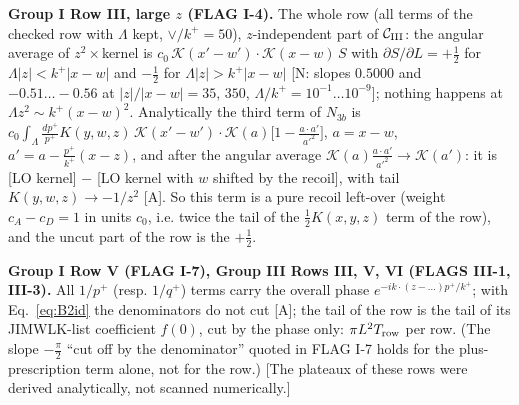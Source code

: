 \documentclass[9pt]{article}
\numberwithin{equation}{section}
\begin{document}
\noindent\textbf{Group I Row III, large $z$ (FLAG I-4).} The whole row (all terms of the checked row with $\Lambda$ kept, $\vee/k^{+}=50$), $z$-independent part of $\mathcal{C}_{\rm III}$: the angular average of $z^{2}\times$kernel is $c_{0}\,\mathcal{K}(x'-w')\cdot\mathcal{K}(x-w)\,S$ with $\partial S/\partial L=+\frac12$ for $\Lambda|z|<k^{+}|x-w|$ and $-\frac12$ for $\Lambda|z|>k^{+}|x-w|$ [N: slopes $0.5000$ and $-0.51\dots-0.56$ at $|z|/|x-w|=35,\,350$, $\Lambda/k^{+}=10^{-1}\dots10^{-9}$]; nothing happens at $\Lambda z^{2}\sim k^{+}(x-w)^{2}$. Analytically the third term of $N_{3b}$ is
$c_{0}\int_{\Lambda}\frac{dp^{+}}{p^{+}}K(y,w,z)\,\mathcal{K}(x'-w')\cdot\mathcal{K}(a)\big[1-\frac{a\cdot a'}{a'^{2}}\big]$, $a=x-w$, $a'=a-\frac{p^{+}}{k^{+}}(x-z)$, and after the angular average $\mathcal{K}(a)\frac{a\cdot a'}{a'^{2}}\to\mathcal{K}(a')$: it is [LO kernel] $-$ [LO kernel with $w$ shifted by the recoil], with tail $K(y,w,z)\to-1/z^{2}$ [A]. So this term is a pure recoil left-over (weight $c_{A}-c_{D}=1$ in units $c_{0}$, i.e. twice the tail of the $\frac12K(x,y,z)$ term of the row), and the uncut part of the row is the $+\frac12$.

\noindent\textbf{Group I Row V (FLAG I-7), Group III Rows III, V, VI (FLAGS III-1, III-3).} All $1/p^{+}$ (resp. $1/q^{+}$) terms carry the overall phase $e^{-ik\cdot(z-\dots)p^{+}/k^{+}}$; with Eq.~\eqref{eq:B2id} the denominators do not cut [A]; the tail of the row is the tail of its JIMWLK-list coefficient $f(0)$, cut by the phase only: $\pi L^{2}T_{\rm row}$ per row. (The slope $-\frac{\pi}{2}$ ``cut off by the denominator'' quoted in FLAG I-7 holds for the plus-prescription term alone, not for the row.) [The plateaux of these rows were derived analytically, not scanned numerically.]
\end{document}
